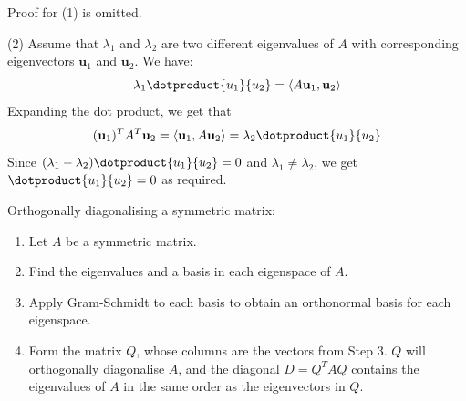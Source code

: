{Proof for (1) is omitted.

(2) Assume that \(\lambda_1\) and \(\lambda_2\) are two different eigenvalues of \(A\) with corresponding eigenvectors \(\mathbf{u}_1\) and \(\mathbf{u}_2\). We have:
\begin{equation}
    \lambda_1\dotproduct{u_1}{u_2} = \langle A\mathbf{u}_1,\mathbf{u}_2 \rangle
\end{equation}
Expanding the dot product, we get that
\begin{equation}
    (\mathbf{u}_1)^TA^T\mathbf{u}_2 = \langle \mathbf{u}_1,A\mathbf{u}_2 \rangle = \lambda_2\dotproduct{u_1}{u_2}
\end{equation}
Since \((\lambda_1 - \lambda_2)\dotproduct{u_1}{u_2} = 0\) and \(\lambda_1 \neq \lambda_2\), we get \(\dotproduct{u_1}{u_2} = 0\) as required.}

Orthogonally diagonalising a symmetric matrix:
\begin{enumerate}
    \item Let \(A\) be a symmetric matrix.
    \item Find the eigenvalues and a basis in each eigenspace of \(A\).
    \item Apply Gram-Schmidt to each basis to obtain an orthonormal basis for each eigenspace.
    \item Form the matrix \(Q\), whose columns are the vectors from Step 3. \(Q\) will orthogonally diagonalise \(A\), and the diagonal \(D = Q^TAQ\) contains the eigenvalues of \(A\) in the same order as the eigenvectors in \(Q\).
\end{enumerate}

